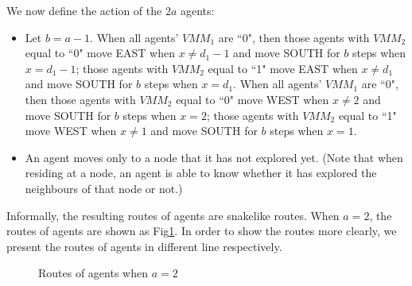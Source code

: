 We now define the action of the $2a$ agents:\\ 
\begin{itemize}
\item Let $b=a-1$. When all agents' $VMM_1$ are ``0", then those agents with $VMM_2$ equal to ``0" move EAST when $x\neq d_1-1$ and move SOUTH for $b$ steps when $x=d_1-1$; those agents with $VMM_2$ equal to ``1" move EAST when $x\neq d_1$ and move SOUTH for $b$ steps  when $x=d_1$. When all agents' $VMM_1$ are ``0", then those agents with $VMM_2$ equal to ``0"  move WEST when $x\neq2$ and move SOUTH for $b$ steps when $x=2$; those agents with $VMM_2$ equal to ``1" move WEST when $x\neq 1$ and move SOUTH for $b$ steps when $x=1$.
\item An agent  moves only to a node that it has not explored yet. (Note that when residing at a node, an agent is able to know whether it has explored the neighbours of that node or not.)
\end{itemize}
Informally, the resulting  routes of agents are snakelike routes. When $a=2$, the routes of agents are shown as Fig\ref{fig:twoagent2}. In order to show the routes more clearly, we present the routes of agents in different line respectively.
\begin{figure} [H]
  \centering 
  \caption{Routes of agents when $a=2$} 
  \label{fig:twoagent2} %
\end{figure}
